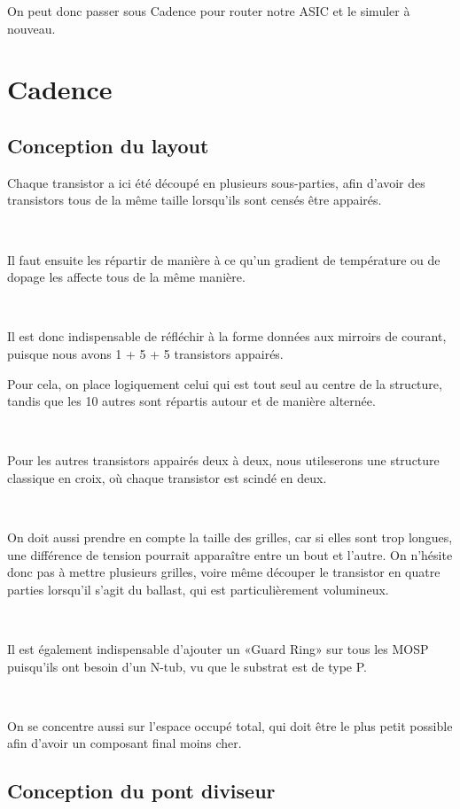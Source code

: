 \documentclass{article}
\begin{document}
On peut donc passer sous Cadence pour router notre ASIC et le simuler à nouveau.

\section{Cadence}

\subsection{Conception du layout}

Chaque transistor a ici été découpé en plusieurs sous-parties, afin d’avoir des transistors tous de la même taille lorsqu’ils sont censés être appairés.

~

Il faut ensuite les répartir de manière à ce qu’un gradient de température ou de dopage les affecte tous de la même manière.

~

Il est donc indispensable de réfléchir à la forme données aux mirroirs de courant, puisque nous avons 1 + 5 + 5 transistors appairés.

Pour cela, on place logiquement celui qui est tout seul au centre de la structure, tandis que les 10 autres sont répartis autour et de manière alternée.

~

Pour les autres transistors appairés deux à deux, nous utileserons une structure classique en croix, où chaque transistor est scindé en deux.

~

On doit aussi prendre en compte la taille des grilles, car si elles sont trop longues, une différence de tension pourrait apparaître entre un bout et l’autre. On n’hésite donc pas à mettre plusieurs grilles, voire même découper le transistor en quatre parties lorsqu’il s’agit du ballast, qui est particulièrement volumineux.

~

Il est également indispensable d’ajouter un «Guard Ring» sur tous les MOSP puisqu’ils ont besoin d’un N-tub, vu que le substrat est de type P.

~

On se concentre aussi sur l’espace occupé total, qui doit être le plus petit possible afin d’avoir un composant final moins cher.

\newpage

\subsection{Conception du pont diviseur}
\end{document}
